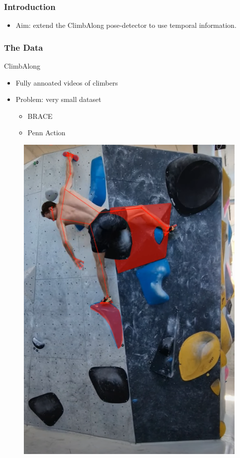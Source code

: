 \documentclass{beamer}
\begin{document}
\begin{frame}
    \frametitle{Introduction}
    \begin{itemize}
        \item<1-> Aim: extend the ClimbAlong pose-detector to use temporal information.
    \end{itemize}
\end{frame}

\begin{frame}
    \frametitle{The Data}
    \begin{minipage}{0.5\textwidth}
        ClimbAlong
        \begin{itemize}
            \item Fully annoated videos of climbers
            \item<2-> Problem: very small dataset
            \begin{itemize}
                \item BRACE
                \item Penn Action
            \end{itemize}
        \end{itemize}
    \end{minipage} \hfill
    \begin{minipage}{0.45\textwidth}
        \begin{figure}
            \center
            \includegraphics[width = \textwidth]{./entities/ClimbAlong_cv.PNG}

\end{figure}
\end{minipage}
\end{frame}
\end{document}
